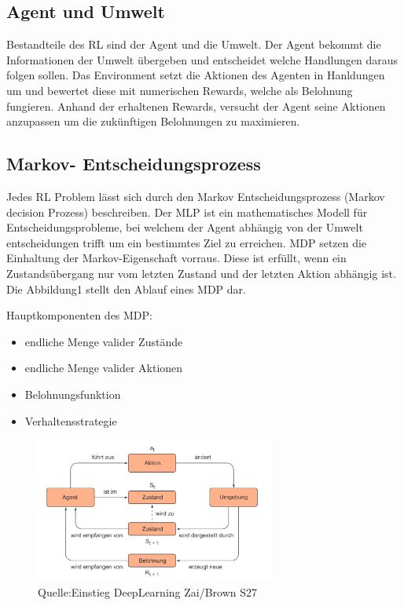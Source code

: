 \subsection{Agent und Umwelt}
Bestandteile des RL sind der Agent und die Umwelt. Der Agent bekommt die Informationen der Umwelt übergeben und entscheidet welche Handlungen daraus folgen sollen.
Das Environment setzt die Aktionen des Agenten in Hanldungen um und bewertet diese mit numerischen Rewards, welche als Belohnung fungieren.
Anhand der erhaltenen Rewards, versucht der Agent seine Aktionen anzupassen um die zukünftigen Belohnungen zu maximieren.

\newpage
\subsection{Markov- Entscheidungsprozess}
Jedes RL Problem lässt sich durch den Markov Entscheidungsprozess (Markov decision Prozess) beschreiben.
Der MLP ist ein mathematisches Modell für Entscheidungsprobleme, bei welchem der Agent abhängig von der Umwelt entscheidungen trifft um ein bestimmtes Ziel zu erreichen.
MDP setzen die Einhaltung der Markov-Eigenschaft vorraus. Diese ist erfüllt, wenn ein Zustandsübergang nur vom letzten Zustand und der letzten Aktion abhängig ist.
Die Abbildung1 stellt den Ablauf eines MDP dar.


Hauptkomponenten des MDP:
\begin{itemize}
\item endliche Menge valider Zustände
\item endliche Menge valider Aktionen
\item Belohnungsfunktion
\item Verhaltensstrategie
\end{itemize}




\begin{figure}[!htb]
	\centering
	\includegraphics[width=0.7\textwidth]{Bilder/Markov.png}
	\caption{Quelle:Einstieg DeepLearning Zai/Brown S27}
\end{figure}

